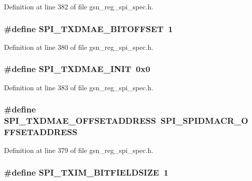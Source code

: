 Definition at line 382 of file gsn\_\-reg\_\-spi\_\-spec.h.

\hypertarget{a00573_a6320c6c2a9d0f65dc5d41b31120d354c}{
\subsubsection[{SPI\_\-TXDMAE\_\-BITOFFSET}]{\setlength{\rightskip}{0pt plus 5cm}\#define SPI\_\-TXDMAE\_\-BITOFFSET~1}}
\label{a00573_a6320c6c2a9d0f65dc5d41b31120d354c}


Definition at line 380 of file gsn\_\-reg\_\-spi\_\-spec.h.

\hypertarget{a00573_a05d19a398baeea4fac5ce87562c6f3ea}{
\subsubsection[{SPI\_\-TXDMAE\_\-INIT}]{\setlength{\rightskip}{0pt plus 5cm}\#define SPI\_\-TXDMAE\_\-INIT~0x0}}
\label{a00573_a05d19a398baeea4fac5ce87562c6f3ea}


Definition at line 383 of file gsn\_\-reg\_\-spi\_\-spec.h.

\hypertarget{a00573_abc19b1e85e7657ff99d850f41a6eddf5}{
\subsubsection[{SPI\_\-TXDMAE\_\-OFFSETADDRESS}]{\setlength{\rightskip}{0pt plus 5cm}\#define SPI\_\-TXDMAE\_\-OFFSETADDRESS~SPI\_\-SPIDMACR\_\-OFFSETADDRESS}}
\label{a00573_abc19b1e85e7657ff99d850f41a6eddf5}


Definition at line 379 of file gsn\_\-reg\_\-spi\_\-spec.h.

\hypertarget{a00573_a73eb5dab3c6ab4f2455672f59935322c}{
\subsubsection[{SPI\_\-TXIM\_\-BITFIELDSIZE}]{\setlength{\rightskip}{0pt plus 5cm}\#define SPI\_\-TXIM\_\-BITFIELDSIZE~1}}
\label{a00573_a73eb5dab3c6ab4f2455672f59935322c}


